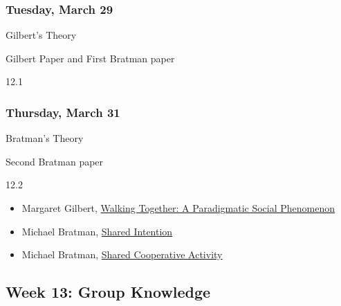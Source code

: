 \documentclass[
]{article}
\providecommand{\tightlist}{%
  \setlength{\itemsep}{0pt}\setlength{\parskip}{0pt}}
\begin{document}
\begin{multicols}{2}

\hypertarget{tuesday-march-29}{%
\subsubsection{Tuesday, March 29}\label{tuesday-march-29}}

\begin{description}
\tightlist
\item[Topic]
Gilbert's Theory
\item[Reading]
Gilbert Paper and First Bratman paper
\item[Video lectures]
12.1
\end{description}

\hypertarget{thursday-march-31}{%
\subsubsection{Thursday, March 31}\label{thursday-march-31}}

\begin{description}
\tightlist
\item[Topic]
Bratman's Theory
\item[Reading]
Second Bratman paper
\item[Video lectures]
12.2
\end{description}

\end{multicols}

\begin{itemize}
\tightlist
\item
  Margaret Gilbert, \href{https://philpapers.org/rec/GILWTA}{Walking
  Together: A Paradigmatic Social Phenomenon}
\item
  Michael Bratman, \href{https://philpapers.org/rec/BRASI}{Shared
  Intention}
\item
  Michael Bratman, \href{https://philpapers.org/rec/BRASCA}{Shared
  Cooperative Activity}
\end{itemize}

\hypertarget{week-13-group-knowledge}{%
\subsection{Week 13: Group Knowledge}\label{week-13-group-knowledge}}
\end{document}
